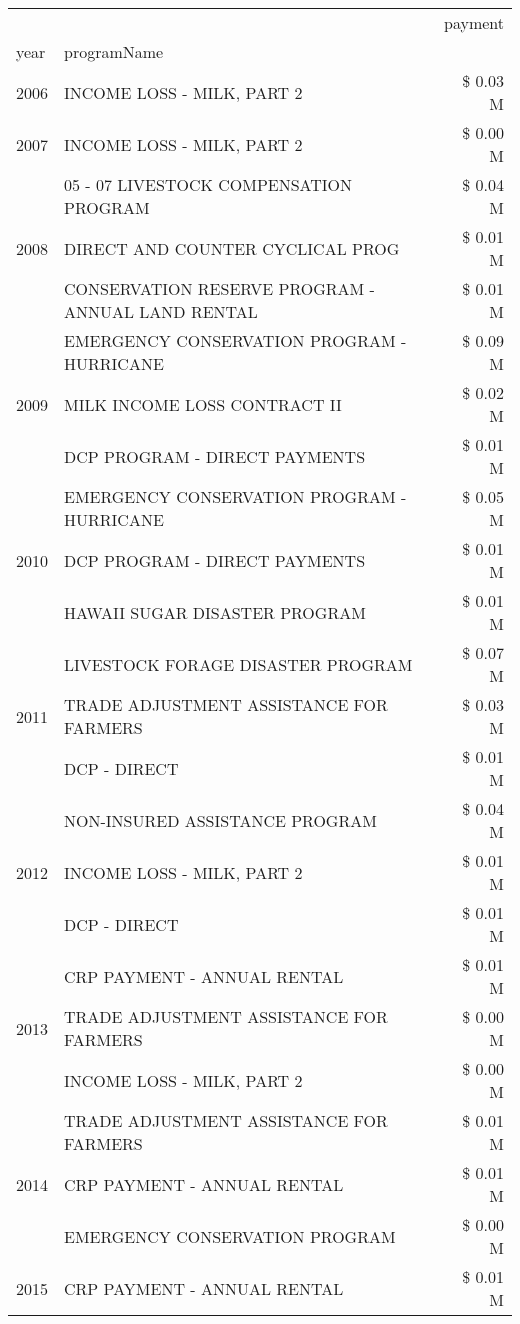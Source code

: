 \begin{tabular}{llr}
\toprule
 &  & payment \\
year & programName &  \\
\midrule
2006 & INCOME LOSS - MILK, PART 2 & \$ 0.03 M \\
\cline{1-3}
2007 & INCOME LOSS - MILK, PART 2 & \$ 0.00 M \\
\cline{1-3}
\multirow[t]{3}{*}{2008} & 05 - 07 LIVESTOCK COMPENSATION PROGRAM & \$ 0.04 M \\
 & DIRECT AND COUNTER CYCLICAL PROG & \$ 0.01 M \\
 & CONSERVATION RESERVE PROGRAM - ANNUAL LAND RENTAL & \$ 0.01 M \\
\cline{1-3}
\multirow[t]{3}{*}{2009} & EMERGENCY CONSERVATION PROGRAM - HURRICANE & \$ 0.09 M \\
 & MILK INCOME LOSS CONTRACT II & \$ 0.02 M \\
 & DCP PROGRAM - DIRECT PAYMENTS & \$ 0.01 M \\
\cline{1-3}
\multirow[t]{3}{*}{2010} & EMERGENCY CONSERVATION PROGRAM - HURRICANE & \$ 0.05 M \\
 & DCP PROGRAM - DIRECT PAYMENTS & \$ 0.01 M \\
 & HAWAII SUGAR DISASTER PROGRAM & \$ 0.01 M \\
\cline{1-3}
\multirow[t]{3}{*}{2011} & LIVESTOCK FORAGE DISASTER PROGRAM & \$ 0.07 M \\
 & TRADE ADJUSTMENT ASSISTANCE FOR FARMERS & \$ 0.03 M \\
 & DCP - DIRECT & \$ 0.01 M \\
\cline{1-3}
\multirow[t]{3}{*}{2012} & NON-INSURED ASSISTANCE PROGRAM & \$ 0.04 M \\
 & INCOME LOSS - MILK, PART 2 & \$ 0.01 M \\
 & DCP - DIRECT & \$ 0.01 M \\
\cline{1-3}
\multirow[t]{3}{*}{2013} & CRP PAYMENT - ANNUAL RENTAL & \$ 0.01 M \\
 & TRADE ADJUSTMENT ASSISTANCE FOR FARMERS & \$ 0.00 M \\
 & INCOME LOSS - MILK, PART 2 & \$ 0.00 M \\
\cline{1-3}
\multirow[t]{3}{*}{2014} & TRADE ADJUSTMENT ASSISTANCE FOR FARMERS & \$ 0.01 M \\
 & CRP PAYMENT - ANNUAL RENTAL & \$ 0.01 M \\
 & EMERGENCY CONSERVATION PROGRAM & \$ 0.00 M \\
\cline{1-3}
2015 & CRP PAYMENT - ANNUAL RENTAL & \$ 0.01 M \\

\end{tabular}
